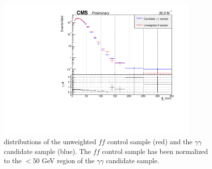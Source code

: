 \begin{figure}[h]
\begin{center}
\includegraphics[width=0.9\textwidth]{Figures/DataAnalysis/ggffUnweighted.pdf}
\end{center}
\caption[\ETmiss distributions of the unweighted $ff$ control sample and the $\gamma\gamma$ candidate sample.]
{\ETmiss distributions of the unweighted $ff$ control sample (red) and the $\gamma\gamma$ candidate sample (blue). The $ff$ control sample has been normalized to the \ETmiss $ < 50$ GeV region of the $\gamma\gamma$ candidate sample. }
\label{fig:ggffUnweighted}
\end{figure}


